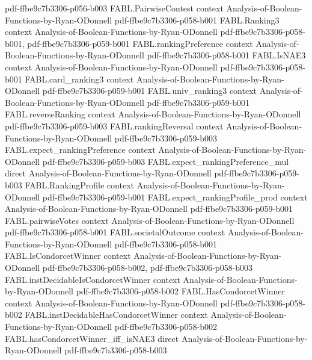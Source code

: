 \begin{theorem}
{    pdf-ffbe9c7b3306-p056-b003}
\proofstep
  {FABL.PairwiseContest}
  {context}
  {Analysis-of-Boolean-Functions-by-Ryan-ODonnell}
  {pdf-ffbe9c7b3306-p058-b001}
\proofstep
  {FABL.Ranking3}
  {context}
  {Analysis-of-Boolean-Functions-by-Ryan-ODonnell}
  {pdf-ffbe9c7b3306-p058-b001,
    pdf-ffbe9c7b3306-p059-b001}
\proofstep
  {FABL.rankingPreference}
  {context}
  {Analysis-of-Boolean-Functions-by-Ryan-ODonnell}
  {pdf-ffbe9c7b3306-p058-b001}
\proofstep
  {FABL.IsNAE3}
  {context}
  {Analysis-of-Boolean-Functions-by-Ryan-ODonnell}
  {pdf-ffbe9c7b3306-p058-b001}
\proofstep
  {FABL.card_ranking3}
  {context}
  {Analysis-of-Boolean-Functions-by-Ryan-ODonnell}
  {pdf-ffbe9c7b3306-p059-b001}
\proofstep
  {FABL.univ_ranking3}
  {context}
  {Analysis-of-Boolean-Functions-by-Ryan-ODonnell}
  {pdf-ffbe9c7b3306-p059-b001}
\proofstep
  {FABL.reverseRanking}
  {context}
  {Analysis-of-Boolean-Functions-by-Ryan-ODonnell}
  {pdf-ffbe9c7b3306-p059-b003}
\proofstep
  {FABL.rankingReversal}
  {context}
  {Analysis-of-Boolean-Functions-by-Ryan-ODonnell}
  {pdf-ffbe9c7b3306-p059-b003}
\proofstep
  {FABL.expect_rankingPreference}
  {context}
  {Analysis-of-Boolean-Functions-by-Ryan-ODonnell}
  {pdf-ffbe9c7b3306-p059-b003}
\proofstep
  {FABL.expect_rankingPreference_mul}
  {direct}
  {Analysis-of-Boolean-Functions-by-Ryan-ODonnell}
  {pdf-ffbe9c7b3306-p059-b003}
\proofstep
  {FABL.RankingProfile}
  {context}
  {Analysis-of-Boolean-Functions-by-Ryan-ODonnell}
  {pdf-ffbe9c7b3306-p059-b001}
\proofstep
  {FABL.expect_rankingProfile_prod}
  {context}
  {Analysis-of-Boolean-Functions-by-Ryan-ODonnell}
  {pdf-ffbe9c7b3306-p059-b001}
\proofstep
  {FABL.pairwiseVotes}
  {context}
  {Analysis-of-Boolean-Functions-by-Ryan-ODonnell}
  {pdf-ffbe9c7b3306-p058-b001}
\proofstep
  {FABL.societalOutcome}
  {context}
  {Analysis-of-Boolean-Functions-by-Ryan-ODonnell}
  {pdf-ffbe9c7b3306-p058-b001}
\proofstep
  {FABL.IsCondorcetWinner}
  {context}
  {Analysis-of-Boolean-Functions-by-Ryan-ODonnell}
  {pdf-ffbe9c7b3306-p058-b002,
    pdf-ffbe9c7b3306-p058-b003}
\proofstep
  {FABL.instDecidableIsCondorcetWinner}
  {context}
  {Analysis-of-Boolean-Functions-by-Ryan-ODonnell}
  {pdf-ffbe9c7b3306-p058-b002}
\proofstep
  {FABL.HasCondorcetWinner}
  {context}
  {Analysis-of-Boolean-Functions-by-Ryan-ODonnell}
  {pdf-ffbe9c7b3306-p058-b002}
\proofstep
  {FABL.instDecidableHasCondorcetWinner}
  {context}
  {Analysis-of-Boolean-Functions-by-Ryan-ODonnell}
  {pdf-ffbe9c7b3306-p058-b002}
\proofstep
  {FABL.hasCondorcetWinner_iff_isNAE3}
  {direct}
  {Analysis-of-Boolean-Functions-by-Ryan-ODonnell}
  {pdf-ffbe9c7b3306-p058-b003}

\end{theorem}
